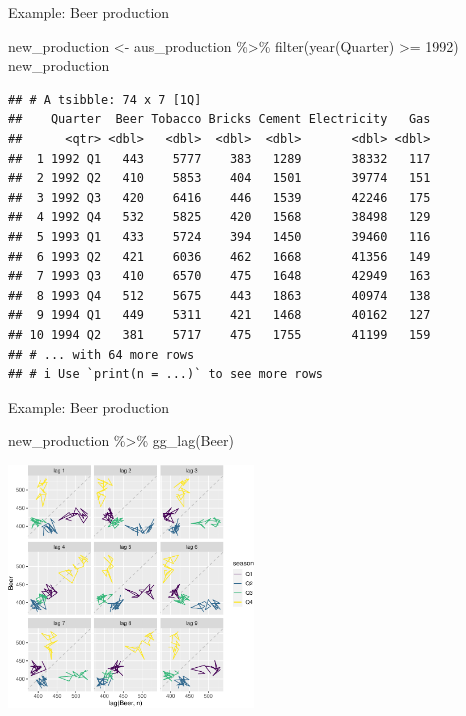\documentclass[14pt,ignorenonframetext,aspectratio=169]{beamer}
\newenvironment{Shaded}{\begin{snugshade}}{\end{snugshade}}
\newcommand{\DecValTok}[1]{\textcolor[rgb]{0.00,0.00,0.81}{#1}}
\newcommand{\FunctionTok}[1]{\textcolor[rgb]{0.00,0.00,0.00}{#1}}
\newcommand{\NormalTok}[1]{#1}
\newcommand{\OtherTok}[1]{\textcolor[rgb]{0.56,0.35,0.01}{#1}}
\newcommand{\SpecialCharTok}[1]{\textcolor[rgb]{0.00,0.00,0.00}{#1}}
\renewenvironment{Shaded}{\color{black}\begin{snugshade}\color{black}}{\end{snugshade}}
\renewenvironment{Shaded}{\color{black}\fontsize{10}{10}\sf\begin{snugshade}\color{black}}{\end{snugshade}}
\begin{document}
\begin{frame}[fragile]{Example: Beer production}
\protect\hypertarget{example-beer-production}{}
\fontsize{10}{10}\sf

\begin{Shaded}
\begin{Highlighting}[]
\NormalTok{new\_production }\OtherTok{\textless{}{-}}\NormalTok{ aus\_production }\SpecialCharTok{\%\textgreater{}\%}
  \FunctionTok{filter}\NormalTok{(}\FunctionTok{year}\NormalTok{(Quarter) }\SpecialCharTok{\textgreater{}=} \DecValTok{1992}\NormalTok{)}
\NormalTok{new\_production}
\end{Highlighting}
\end{Shaded}

\begin{verbatim}
## # A tsibble: 74 x 7 [1Q]
##    Quarter  Beer Tobacco Bricks Cement Electricity   Gas
##      <qtr> <dbl>   <dbl>  <dbl>  <dbl>       <dbl> <dbl>
##  1 1992 Q1   443    5777    383   1289       38332   117
##  2 1992 Q2   410    5853    404   1501       39774   151
##  3 1992 Q3   420    6416    446   1539       42246   175
##  4 1992 Q4   532    5825    420   1568       38498   129
##  5 1993 Q1   433    5724    394   1450       39460   116
##  6 1993 Q2   421    6036    462   1668       41356   149
##  7 1993 Q3   410    6570    475   1648       42949   163
##  8 1993 Q4   512    5675    443   1863       40974   138
##  9 1994 Q1   449    5311    421   1468       40162   127
## 10 1994 Q2   381    5717    475   1755       41199   159
## # ... with 64 more rows
## # i Use `print(n = ...)` to see more rows
\end{verbatim}
\end{frame}

\begin{frame}[fragile]{Example: Beer production}
\protect\hypertarget{example-beer-production-1}{}
\fontsize{10}{10}\sf

\begin{Shaded}
\begin{Highlighting}[]
\NormalTok{new\_production }\SpecialCharTok{\%\textgreater{}\%} \FunctionTok{gg\_lag}\NormalTok{(Beer)}
\end{Highlighting}
\end{Shaded}

\includegraphics[width=6.5cm]{2-tsgraphics_files/figure-beamer/unnamed-chunk-23-1}
\end{frame}
\end{document}
